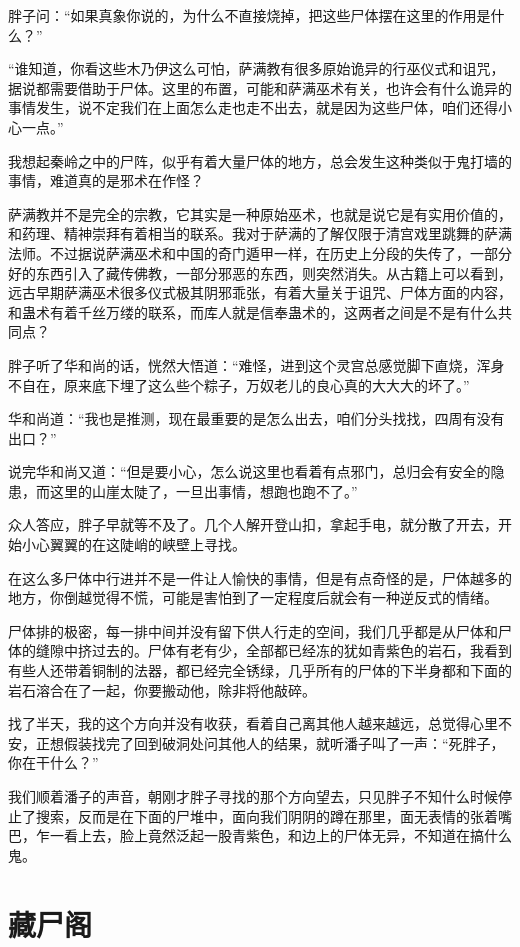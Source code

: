 胖子问：“如果真象你说的，为什么不直接烧掉，把这些尸体摆在这里的作用是什么？”

“谁知道，你看这些木乃伊这么可怕，萨满教有很多原始诡异的行巫仪式和诅咒，据说都需要借助于尸体。这里的布置，可能和萨满巫术有关，也许会有什么诡异的事情发生，说不定我们在上面怎么走也走不出去，就是因为这些尸体，咱们还得小心一点。”

我想起秦岭之中的尸阵，似乎有着大量尸体的地方，总会发生这种类似于鬼打墙的事情，难道真的是邪术在作怪？

萨满教并不是完全的宗教，它其实是一种原始巫术，也就是说它是有实用价值的，和药理、精神崇拜有着相当的联系。我对于萨满的了解仅限于清宫戏里跳舞的萨满法师。不过据说萨满巫术和中国的奇门遁甲一样，在历史上分段的失传了，一部分好的东西引入了藏传佛教，一部分邪恶的东西，则突然消失。从古籍上可以看到，远古早期萨满巫术很多仪式极其阴邪乖张，有着大量关于诅咒、尸体方面的内容，和蛊术有着千丝万缕的联系，而库人就是信奉蛊术的，这两者之间是不是有什么共同点？

胖子听了华和尚的话，恍然大悟道：“难怪，进到这个灵宫总感觉脚下直烧，浑身不自在，原来底下埋了这么些个粽子，万奴老儿的良心真的大大大的坏了。”

华和尚道：“我也是推测，现在最重要的是怎么出去，咱们分头找找，四周有没有出口？”

说完华和尚又道：“但是要小心，怎么说这里也看着有点邪门，总归会有安全的隐患，而这里的山崖太陡了，一旦出事情，想跑也跑不了。”

众人答应，胖子早就等不及了。几个人解开登山扣，拿起手电，就分散了开去，开始小心翼翼的在这陡峭的峡壁上寻找。

在这么多尸体中行进并不是一件让人愉快的事情，但是有点奇怪的是，尸体越多的地方，你倒越觉得不慌，可能是害怕到了一定程度后就会有一种逆反式的情绪。

尸体排的极密，每一排中间并没有留下供人行走的空间，我们几乎都是从尸体和尸体的缝隙中挤过去的。尸体有老有少，全部都已经冻的犹如青紫色的岩石，我看到有些人还带着铜制的法器，都已经完全锈绿，几乎所有的尸体的下半身都和下面的岩石溶合在了一起，你要搬动他，除非将他敲碎。

找了半天，我的这个方向并没有收获，看着自己离其他人越来越远，总觉得心里不安，正想假装找完了回到破洞处问其他人的结果，就听潘子叫了一声：“死胖子，你在干什么？”

我们顺着潘子的声音，朝刚才胖子寻找的那个方向望去，只见胖子不知什么时候停止了搜索，反而是在下面的尸堆中，面向我们阴阴的蹲在那里，面无表情的张着嘴巴，乍一看上去，脸上竟然泛起一股青紫色，和边上的尸体无异，不知道在搞什么鬼。

\chapter{藏尸阁}

